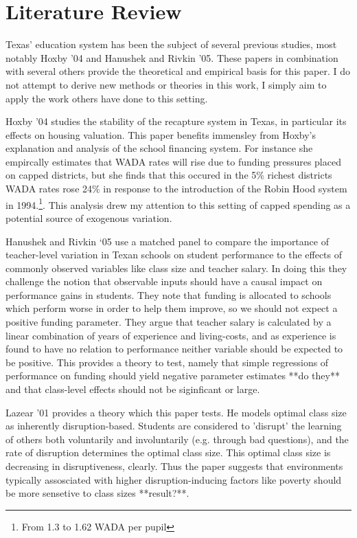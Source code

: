 \documentclass[11pt]{article}
\begin{document}
\section{Literature Review}
\label{s:next}

Texas' education system has been the subject of several previous studies, most notably Hoxby '04 and Hanushek and Rivkin '05. These papers in combination with several others provide the theoretical and empirical basis for this paper. I do not attempt to derive new methods or theories in this work, I simply aim to apply the work others have done to this setting. 

Hoxby ’04 studies the stability of the recapture system in Texas, in particular its effects on housing valuation. This paper benefits immensley from Hoxby's explanation and analysis of the school financing system. For instance she empircally estimates that WADA rates will rise due to funding pressures placed on capped districts, but she finds that this occured in the 5\% richest districts WADA rates rose 24\% in response to the introduction of the Robin Hood system in 1994.\footnote{From 1.3 to 1.62 WADA per pupil}. This analysis drew my attention to this setting of capped spending as a potential source of exogenous variation. 

Hanushek and Rivkin ‘05 use a matched panel to compare the importance of teacher-level variation in Texan schools on student performance to the effects of commonly observed variables like class size and teacher salary. In doing this they challenge the notion that observable inputs should have a causal impact on performance gains in students. They note that funding is allocated to schools which perform worse in order to help them improve, so we should not expect a positive funding parameter. They argue that teacher salary is calculated by a linear combination of years of experience and living-costs, and as experience is found to have no relation to performance neither variable should be expected to be positive. This provides a theory to test, namely that simple regressions of performance on funding should yield negative parameter estimates **do they** and that class-level effects should not be siginficant or large. 

Lazear '01 provides a theory which this paper tests. He models optimal class size as inherently disruption-based. Students are considered to 'disrupt' the learning of others both voluntarily and involuntarily (e.g. through bad questions), and the rate of disruption determines the optimal class size. This optimal class size is decreasing in disruptiveness, clearly. Thus the paper suggests that environments typically assosciated with higher disruption-inducing factors like poverty should be more sensetive to class sizes **result?**. 
\end{document}
